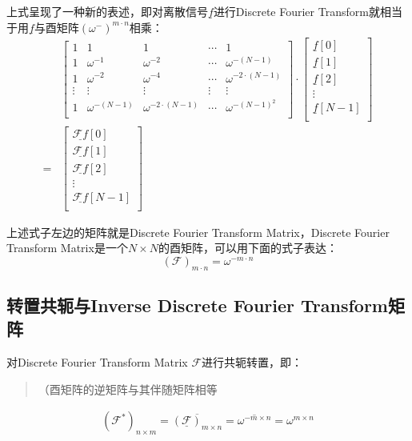 上式呈现了一种新的表述，即对离散信号$\underline{f}$进行Discrete Fourier Transform就相当于用$\underline{f}$与酉矩阵$(\omega^-)^{m\cdot n}$相乘：
\begin{align*}
	  & \left[
		\begin{matrix}
			1      & 1               & 1                     & \cdots & 1                     \\
			1      & \omega^{-1}     & \omega^{-2}           & \cdots & \omega^{-(N-1)}       \\
			1      & \omega^{-2}     & \omega^{-4}           & \cdots & \omega^{-2\cdot(N-1)} \\
			\vdots & \vdots          & \vdots                & \vdots & \vdots                \\
			1      & \omega^{-(N-1)} & \omega^{-2\cdot(N-1)} & \cdots & \omega^{-(N-1)^2}     \\
		\end{matrix}
		\right]
	\cdot
	\left[
		\begin{matrix}
			\underline{f}[0]   \\
			\underline{f}[1]   \\
			\underline{f}[2]   \\
			\vdots             \\
			\underline{f}[N-1] \\
		\end{matrix}
		\right]    \\
	= & \left[
		\begin{matrix}
			\underline{\mathcal{F}f}[0]   \\
			\underline{\mathcal{F}f}[1]   \\
			\underline{\mathcal{F}f}[2]   \\
			\vdots                        \\
			\underline{\mathcal{F}f}[N-1] \\
		\end{matrix}
		\right]
\end{align*}

上述式子左边的矩阵就是Discrete Fourier Transform Matrix，Discrete Fourier Transform Matrix是一个$N\times N$的酉矩阵，可以用下面的式子表达：
\begin{equation}
	(\mathcal{F})_{m\cdot n}=\omega^{-m\cdot n}
\end{equation}
\subsection{转置共轭与Inverse Discrete Fourier Transform矩阵}
对Discrete Fourier Transform Matrix  $\mathcal{F}$进行共轭转置，即：
\begin{quote}
	（酉矩阵的逆矩阵与其伴随矩阵相等
\end{quote}
\begin{align*}
	(\mathcal{F}^{*})_{n\times m} = \overline{(\underline{\mathcal{F}})_{m\times n}} = \overline{\omega^{-m\times n}} = \omega^{m\times n}
\end{align*}

